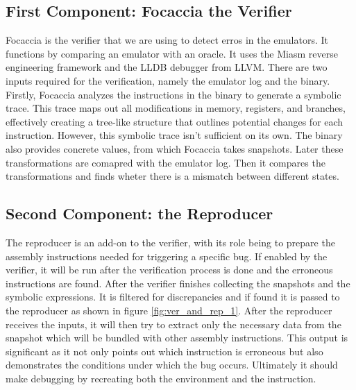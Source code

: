\subsection{First Component: Focaccia the Verifier}

Focaccia is the verifier that we are using to detect erros in the emulators.
It functions by comparing an emulator with an oracle.
It uses the Miasm reverse engineering framework and the LLDB debugger from LLVM. 
There are two inputs required for the verification, namely the emulator log and the binary.
Firstly, Focaccia analyzes the instructions in the binary to generate a symbolic trace.
This trace maps out all modifications in memory, registers, and branches, effectively creating a tree-like structure that outlines potential changes for each instruction.
However, this symbolic trace isn't sufficient on its own. 
The binary also provides concrete values, from which Focaccia takes snapshots.
Later these transformations are comapred with the emulator log.
Then it compares the transformations and finds wheter there is a mismatch between different states.

\subsection{Second Component: the Reproducer}
The reproducer is an add-on to the verifier, with its role being to prepare the assembly instructions needed for triggering a specific bug. 
If enabled by the verifier, it will be run after the verification process is done and the erroneous instructions are found.
After the verifier finishes collecting the snapshots and the symbolic expressions.
It is filtered for discrepancies and if found it is passed to the reproducer as shown in figure \ref{fig:ver_and_rep_1}.
After the reproducer receives the inputs, it will then try to extract only the necessary data from the snapshot which will be bundled with other assembly instructions.
This output is significant as it not only points out which instruction is erroneous but also demonstrates the conditions under which the bug occurs.
Ultimately it should make debugging by recreating both the environment and the instruction.




